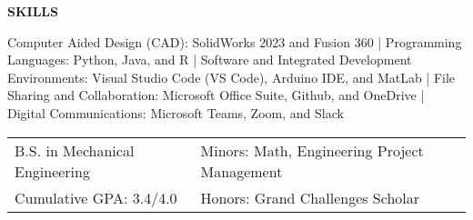 \documentclass[18pt]{article}
\begin{document}
\begin{center}
    \textbf{SKILLS}
    \hrulefill
\end{center}

\justify Computer Aided Design (CAD): SolidWorks 2023 and Fusion 360 | Programming Languages: Python, Java, and R | Software and Integrated Development Environments: Visual Studio Code (VS Code), Arduino IDE, and MatLab | File Sharing and Collaboration: Microsoft Office Suite, Github, and OneDrive | Digital Communications: Microsoft Teams, Zoom, and Slack

\begin{tabular}{l|l} %
    B.S. in Mechanical Engineering \hspace*{0.75in} & Minors: Math, Engineering Project Management \\ 
    Cumulative GPA: 3.4/4.0 & Honors: Grand Challenges Scholar\\
\end{tabular}
\end{document}

